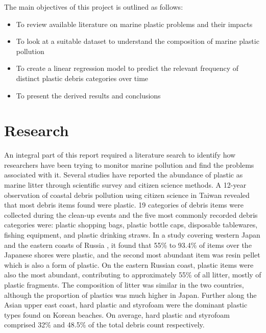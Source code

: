 \documentclass[10pt]{article}\usepackage[]{graphicx}\usepackage[]{color}
\begin{document}
The main objectives of this project is outlined as follows:
\begin{itemize}	
\item To review available literature on marine plastic problems and their impacts
\item To look at a suitable dataset to understand the composition of marine plastic pollution 
\item To create a linear regression model to predict the relevant frequency of distinct plastic debris categories over time
\item To present the derived results and conclusions 

\end{itemize}





























\pagebreak
\section{Research}\label{research}

An integral part of this report required a literature search to identify how researchers have been trying to monitor marine pollution and find the problems associated with it. Several studies have reported the abundance of plastic as marine litter through scientific survey and citizen science methods. A 12-year observation of coastal debris pollution using citizen science in Taiwan revealed that most debris items found were plastic. \cite{WALTHER2018} 19 categories of debris items were collected during the clean-up events and the five most commonly recorded debris categories were: plastic shopping bags, plastic bottle caps, disposable tablewares, fishing equipment, and plastic drinking straws. In a study covering western Japan and the eastern coasts of Russia \cite{KUSUI2003}, it found that 55\% to 93.4\% of items over the Japanese shores were plastic, and the second most abundant item was resin pellet which is also a form of plastic. On the eastern Russian coast, plastic items were also the most abundant, contributing to approximately 55\% of all litter, mostly of plastic fragments. The composition of litter was similar in the two countries, although the proportion of plastics was much higher in Japan. \cite{KUSUI2003} Further along the Asian upper east coast, hard plastic and styrofoam were the dominant plastic types found on Korean beaches. On average, hard plastic and styrofoam comprised 32\% and 48.5\% of the total debris count respectively. \\
\end{document}
